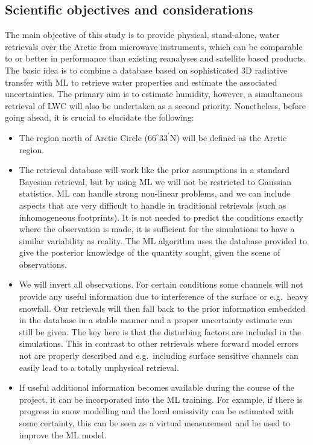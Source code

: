 \documentclass[12pt,oneside,a4paper]{article}
\begin{document}
\subsection{Scientific objectives and considerations}
The main objective of this study is to provide physical, stand-alone, water retrievals over the Arctic from microwave instruments, which can be comparable to or better in performance than existing reanalyses and satellite based products. The basic idea is to combine a database based on sophisticated 3D radiative transfer with ML to retrieve water properties and estimate the associated uncertainties. The primary aim is to estimate humidity, however, a simultaneous retrieval of LWC will also be undertaken as a second priority. Nonetheless, before going ahead, it is crucial to elucidate the following:
\begin{itemize}
 \vspace{-1ex}
\item The region north of Arctic Circle ($66^{\circ}33^{'}$N) will be defined
  as the Arctic region.
 \vspace{-1ex}
\item The retrieval database will work like the prior assumptions in a standard
  Bayesian retrieval, but by using ML we will not be restricted to Gaussian
  statistics. ML can handle strong non-linear problems, and we can include
  aspects that are very difficult to handle in traditional retrievals (such as
  inhomogeneous footprints). It is not needed to predict the conditions exactly
  where the observation is made, it is sufficient for the simulations to have a
  similar variability as reality. The ML algorithm uses the database provided
  to give the posterior knowledge of the quantity sought, given the scene of
  observations.
 \vspace{-1ex}
\item We will invert all observations. For certain conditions some channels
  will not provide any useful information due to interference of the surface or
  e.g.\ heavy snowfall. Our retrievals will then fall back to the prior
  information embedded in the database in a stable manner and a proper
  uncertainty estimate can still be given. The key here is that the disturbing
  factors are included in the simulations. This in contrast to other retrievals
  where forward model errors not are properly described and e.g.\ including
  surface sensitive channels can easily lead to a totally unphysical retrieval.
  \vspace{-1ex}
\item If useful additional information becomes available during the course of
  the project, it can be incorporated into the ML training. For example, if
  there is progress in snow modelling and the local emissivity can be estimated
  with some certainty, this can be seen as a virtual measurement and be used to
  improve the ML model.
\end{itemize}
\end{document}
